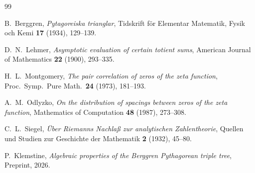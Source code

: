 \documentclass[12pt]{amsart}
\theoremstyle{definition}
\theoremstyle{remark}
\begin{document}

\begin{thebibliography}{99}

B.~Berggren,
\emph{Pytagoreiska trianglar},
Tidskrift f\"or Elementar Matematik, Fysik och Kemi \textbf{17} (1934), 129--139.

D.~N.~Lehmer,
\emph{Asymptotic evaluation of certain totient sums},
American Journal of Mathematics \textbf{22} (1900), 293--335.

H.~L.~Montgomery,
\emph{The pair correlation of zeros of the zeta function},
Proc.\ Symp.\ Pure Math.\ \textbf{24} (1973), 181--193.

A.~M.~Odlyzko,
\emph{On the distribution of spacings between zeros of the zeta function},
Mathematics of Computation \textbf{48} (1987), 273--308.

C.~L.~Siegel,
\emph{\"Uber Riemanns Nachla{\ss} zur analytischen Zahlentheorie},
Quellen und Studien zur Geschichte der Mathematik \textbf{2} (1932), 45--80.

P.~Klemstine,
\emph{Algebraic properties of the Berggren Pythagorean triple tree},
Preprint, 2026.

\end{thebibliography}
\end{document}
